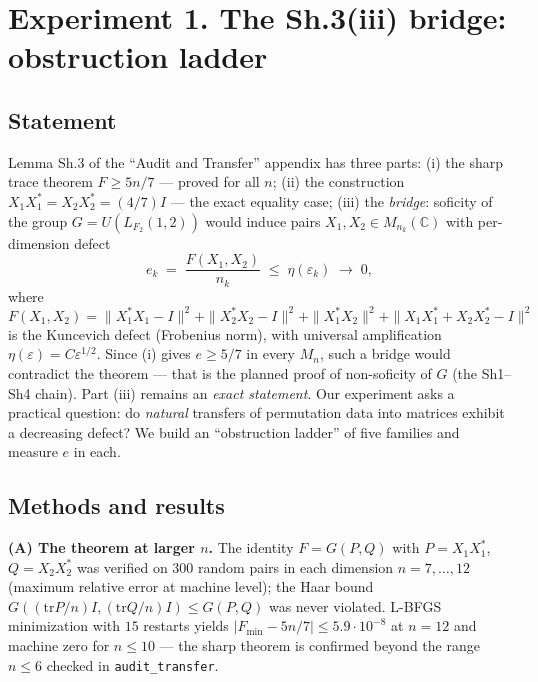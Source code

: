 \documentclass[11pt,a4paper]{article}
\begin{document}
\section{Experiment 1. The Sh.3(iii) bridge: obstruction ladder}\label{sec:sh3}

\subsection{Statement}

Lemma Sh.3 of the ``Audit and Transfer'' appendix has three parts: (i) the
sharp trace theorem $F \ge 5n/7$ --- proved for all $n$; (ii) the construction
$X_1X_1^* = X_2X_2^* = (4/7)I$ --- the exact equality case; (iii) the
\emph{bridge}: soficity of the group $G = U(L_{F_2}(1,2))$ would induce pairs
$X_1, X_2 \in M_{n_k}(\mathbb{C})$ with per-dimension defect
\begin{equation}\label{eq:defect}
e_k \;=\; \frac{F(X_1,X_2)}{n_k} \;\le\; \eta(\varepsilon_k) \;\to\; 0,
\end{equation}
where
\begin{equation}\label{eq:Fdef}
F(X_1,X_2) = \|X_1^*X_1 - I\|^2 + \|X_2^*X_2 - I\|^2 + \|X_1^*X_2\|^2 + \|X_1X_1^* + X_2X_2^* - I\|^2
\end{equation}
is the Kuncevich defect (Frobenius norm), with universal amplification
$\eta(\varepsilon) = C\varepsilon^{1/2}$. Since (i) gives $e \ge 5/7$ in every
$M_n$, such a bridge would contradict the theorem --- that is the planned proof
of non-soficity of $G$ (the Sh1--Sh4 chain). Part (iii) remains an \emph{exact
statement}. Our experiment asks a practical question: do \emph{natural}
transfers of permutation data into matrices exhibit a decreasing defect? We
build an ``obstruction ladder'' of five families and measure $e$ in each.

\subsection{Methods and results}

\textbf{(A) The theorem at larger $n$.} The identity $F = G(P,Q)$ with
$P = X_1X_1^*$, $Q = X_2X_2^*$ was verified on $300$ random pairs in each
dimension $n = 7,\dots,12$ (maximum relative error at machine level); the Haar
bound $G((\mathrm{tr}P/n)I, (\mathrm{tr}Q/n)I) \le G(P,Q)$ was never violated.
L-BFGS minimization with $15$ restarts yields $|F_{\min} - 5n/7| \le
5.9\cdot10^{-8}$ at $n = 12$ and machine zero for $n \le 10$ --- the sharp
theorem is confirmed beyond the range $n \le 6$ checked in
\texttt{audit\_transfer}.
\end{document}
